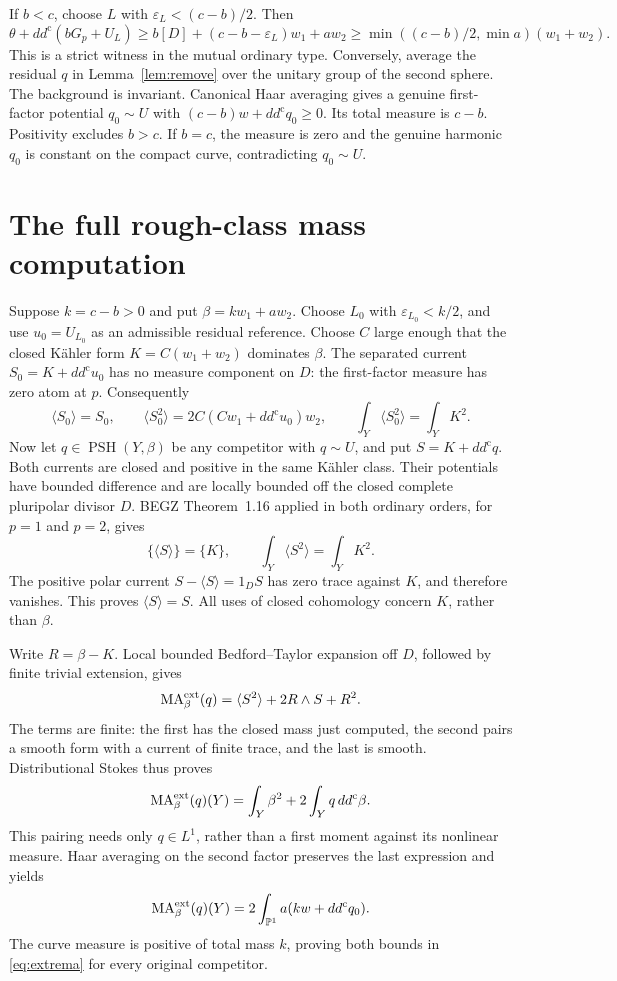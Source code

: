 \documentclass[11pt]{article}
\theoremstyle{remark}
\newcommand{\ddc}{dd^{\mathrm c}}
\newcommand{\PSH}{\operatorname{PSH}}
\newcommand{\MA}{\operatorname{MA}}
\newcommand{\PP}{\mathbb P}
\begin{document}
If $b<c$, choose $L$ with $\varepsilon_L<(c-b)/2$. Then
\[
 \theta+\ddc(bG_p+U_L)
 \geq b[D]+(c-b-\varepsilon_L)w_1+aw_2
 \geq\min((c-b)/2,\min a)(w_1+w_2).
\]
This is a strict witness in the mutual ordinary type. Conversely, average
the residual $q$ in Lemma~\ref{lem:remove} over the unitary group of the
second sphere. The background is invariant. Canonical Haar averaging gives
a genuine first-factor potential $q_0\sim U$ with
$(c-b)w+\ddc q_0\geq0$. Its total measure is $c-b$. Positivity excludes
$b>c$. If $b=c$, the measure is zero and the genuine harmonic $q_0$ is
constant on the compact curve, contradicting $q_0\sim U$.

\section{The full rough-class mass computation}
Suppose $k=c-b>0$ and put $\beta=kw_1+aw_2$. Choose $L_0$ with
$\varepsilon_{L_0}<k/2$, and use $u_0=U_{L_0}$ as an admissible residual
reference. Choose $C$ large enough that the closed K\"ahler form
$K=C(w_1+w_2)$ dominates $\beta$. The separated current
$S_0=K+\ddc u_0$ has no measure component on $D$: the first-factor
measure has zero atom at $p$. Consequently
\[
 \langle S_0\rangle=S_0,\qquad
 \langle S_0^2\rangle=2C(Cw_1+\ddc u_0)w_2,
 \qquad\int_Y\langle S_0^2\rangle=\int_YK^2.
\]
Now let $q\in\PSH(Y,\beta)$ be any competitor with $q\sim U$, and put
$S=K+\ddc q$. Both currents are closed and positive in the same K\"ahler
class. Their potentials have bounded difference and are locally bounded
off the closed complete pluripolar divisor $D$. BEGZ Theorem~1.16 applied
in both ordinary orders, for $p=1$ and $p=2$, gives
\[
 \{\langle S\rangle\}=\{K\},\qquad
 \int_Y\langle S^2\rangle=\int_YK^2.
\]
The positive polar current $S-\langle S\rangle=1_DS$ has zero trace
against $K$, and therefore vanishes. This proves $\langle S\rangle=S$.
All uses of closed cohomology concern $K$, rather than $\beta$.

Write $R=\beta-K$. Local bounded Bedford--Taylor expansion off $D$,
followed by finite trivial extension, gives
\[
 \MA^{\rm ext}_\beta(q)=\langle S^2\rangle+2R\wedge S+R^2.
\]
The terms are finite: the first has the closed mass just computed, the
second pairs a smooth form with a current of finite trace, and the last
is smooth. Distributional Stokes thus proves
\[
 \MA^{\rm ext}_\beta(q)(Y)=\int_Y\beta^2+2\int_Yq\,\ddc\beta.
\]
This pairing needs only $q\in L^1$, rather than a first moment against
its nonlinear measure. Haar averaging on the second factor preserves the
last expression and yields
\[
 \MA^{\rm ext}_\beta(q)(Y)=2\int_{\PP^1}a(kw+\ddc q_0).
\]
The curve measure is positive of total mass $k$, proving both bounds in
\eqref{eq:extrema} for every original competitor.
\end{document}
